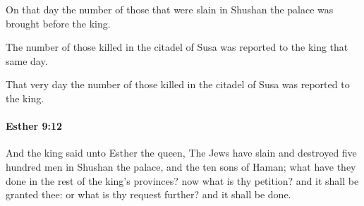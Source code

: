 			\begin{versebox}
					\item[BHS] 
					\item[LXX] 
					\item[ASV] On that day the number of those that were slain in Shushan the palace was brought before the king.
					\item[NIV] The number of those killed in the citadel of Susa was reported to the king that same day.
					\item[NRSV] That very day the number of those killed in the citadel of Susa was reported to the king.
			\end{versebox}

		\paragraph{Esther 9:12} %
			\label{ESTHER-9-12}

			And the king said unto Esther the queen, The Jews have slain and destroyed five hundred men in Shushan the palace, and the ten sons of Haman; what have they done in the rest of the king’s provinces? now what is thy petition? and it shall be granted thee: or what is thy request further? and it shall be done.

